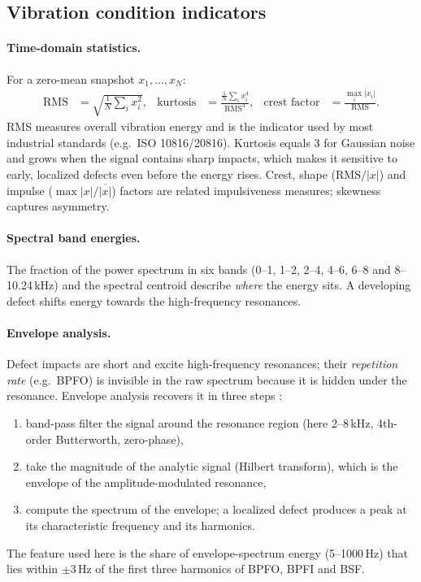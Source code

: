\documentclass[11pt]{article}
\begin{document}
\subsection{Vibration condition indicators}
\paragraph{Time-domain statistics.} For a zero-mean snapshot $x_1,\dots,x_N$:
\begin{align}
\text{RMS} &= \sqrt{\tfrac{1}{N}\textstyle\sum_i x_i^2}, &
\text{kurtosis} &= \frac{\tfrac{1}{N}\sum_i x_i^4}{\text{RMS}^4}, &
\text{crest factor} &= \frac{\max_i |x_i|}{\text{RMS}}.
\end{align}
RMS measures overall vibration energy and is the indicator used by most industrial standards (e.g.\
ISO 10816/20816). Kurtosis equals 3 for Gaussian noise and grows when the signal contains sharp
impacts, which makes it sensitive to early, localized defects even before the energy rises.
Crest, shape ($\text{RMS}/\overline{|x|}$) and impulse ($\max|x|/\overline{|x|}$) factors are related
impulsiveness measures; skewness captures asymmetry.

\paragraph{Spectral band energies.} The fraction of the power spectrum in six bands
(0--1, 1--2, 2--4, 4--6, 6--8 and 8--10.24\,kHz) and the spectral centroid describe \emph{where} the
energy sits. A developing defect shifts energy towards the high-frequency resonances.

\paragraph{Envelope analysis.} Defect impacts are short and excite high-frequency resonances; their
\emph{repetition rate} (e.g.\ BPFO) is invisible in the raw spectrum because it is hidden under the
resonance. Envelope analysis recovers it in three steps \cite{randall2011}:
\begin{enumerate}
  \item band-pass filter the signal around the resonance region (here 2--8\,kHz, 4th-order
        Butterworth, zero-phase),
  \item take the magnitude of the analytic signal (Hilbert transform), which is the envelope of the
        amplitude-modulated resonance,
  \item compute the spectrum of the envelope; a localized defect produces a peak at its
        characteristic frequency and its harmonics.
\end{enumerate}
The feature used here is the share of envelope-spectrum energy (5--1000\,Hz) that lies within
$\pm3$\,Hz of the first three harmonics of BPFO, BPFI and BSF.
\end{document}
